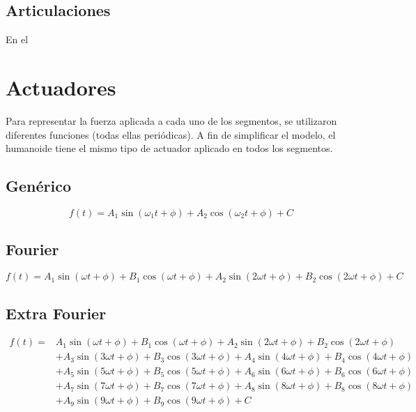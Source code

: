 \documentclass{article}
\begin{document}
\subsection{Articulaciones}
En el 
\section{Actuadores}

Para representar la fuerza aplicada a cada uno de los segmentos, se utilizaron diferentes funciones (todas ellas peri\'odicas). A fin de simplificar el modelo, el humanoide tiene el mismo tipo de actuador aplicado en todos los segmentos.

\subsection{Gen\'erico}

\begin{equation}
  f(t) =  A_1 \sin(\omega_1t+\phi)+A_2 \cos(\omega_2t+\phi)+C
\end{equation}

\subsection{Fourier}

\begin{equation}
  f(t) =  A_1 \sin(\omega t+\phi)+B_1 \cos(\omega t+\phi)+A_2 \sin(2\omega t+\phi)+B_2 \cos(2\omega t+\phi)+C
\end{equation}

\subsection{Extra Fourier}

\begin{equation}
\begin{split}
  f(t) = &   A_1 \sin(\omega t+\phi)+B_1 \cos(\omega t+\phi)+A_2 \sin(2\omega t+\phi)+B_2 \cos(2\omega t+\phi) \\
  &+A_3 \sin(3\omega t+\phi)+B_3 \cos(3\omega t+\phi)+A_4 \sin(4\omega t+\phi)+B_4 \cos(4\omega t+\phi) \\ 
  &+A_5 \sin(5\omega t+\phi)+B_5 \cos(5\omega t+\phi)+A_6 \sin(6\omega t+\phi)+B_6 \cos(6\omega t+\phi) \\
  &+A_7 \sin(7\omega t+\phi)+B_7 \cos(7\omega t+\phi)+A_8 \sin(8\omega t+\phi)+B_8 \cos(8\omega t+\phi) \\
  &+A_9 \sin(9\omega t+\phi)+B_9 \cos(9\omega t+\phi) + C
\end{split}
\end{equation}
\end{document}
